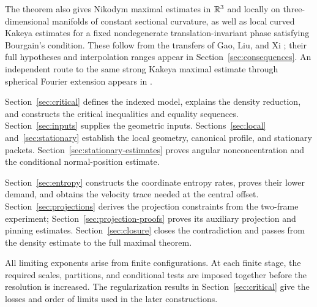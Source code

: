 The theorem also gives Nikodym maximal estimates in \(\mathbb R^3\) and locally
on three-dimensional manifolds of constant sectional curvature, as well
as local curved Kakeya estimates for a fixed nondegenerate translation-invariant phase
satisfying Bourgain's condition. These follow from the transfers of
Gao, Liu, and Xi \citep{GLX2025}; their full hypotheses and interpolation
ranges appear in Section~\ref{sec:consequences}. An independent route to
the same strong Kakeya maximal estimate through spherical Fourier
extension appears in \citet[Corollary~1.3]{OpenAISphere2026}.

Section~\ref{sec:critical} defines the indexed model, explains the density
reduction, and constructs the critical inequalities and equality
sequences. Section~\ref{sec:inputs} supplies the geometric inputs.
Sections~\ref{sec:local} and~\ref{sec:stationary} establish the local
geometry, canonical profile, and stationary packets.
Section~\ref{sec:stationary-estimates} proves angular nonconcentration
and the conditional normal-position estimate.

Section~\ref{sec:entropy} constructs the coordinate entropy rates,
proves their lower demand, and obtains the velocity trace needed at the
central offset. Section~\ref{sec:projections} derives the projection
constraints from the two-frame experiment;
Section~\ref{sec:projection-proofs} proves its auxiliary projection and
pinning estimates. Section~\ref{sec:closure} closes the contradiction and
passes from the density estimate to the full maximal theorem.

All limiting exponents arise from finite configurations. At each finite
stage, the required scales, partitions, and conditional tests are imposed
together before the resolution is increased. The regularization results
in Section~\ref{sec:critical} give the losses and order of limits used in
the later constructions.
